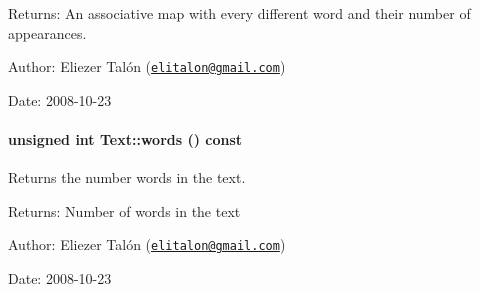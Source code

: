 \begin{Desc}
\item[Returns:]An associative map with every different word and their number of appearances.\end{Desc}
\begin{Desc}
\item[Author:]Eliezer Talón (\href{mailto:elitalon@gmail.com}{\tt elitalon@gmail.com}) \end{Desc}
\begin{Desc}
\item[Date:]2008-10-23 \end{Desc}
\hypertarget{class_text_edfd71af7802a2d72eed7365f081a66d}{
\paragraph[{words}]{\setlength{\rightskip}{0pt plus 5cm}unsigned int Text::words () const}\hfill}
\label{class_text_edfd71af7802a2d72eed7365f081a66d}


Returns the number words in the text. 

\begin{Desc}
\item[Returns:]Number of words in the text\end{Desc}
\begin{Desc}
\item[Author:]Eliezer Talón (\href{mailto:elitalon@gmail.com}{\tt elitalon@gmail.com}) \end{Desc}
\begin{Desc}
\item[Date:]2008-10-23 \end{Desc}
